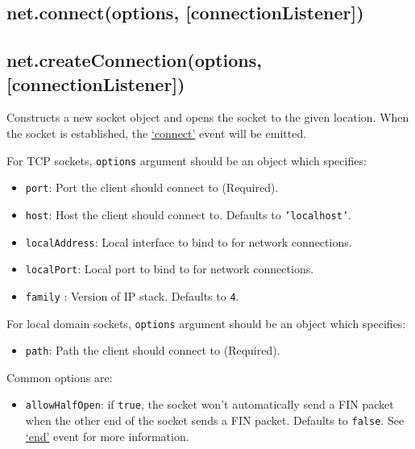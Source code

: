 \subsection{net.connect(options,
{[}connectionListener{]})}\label{net.connectoptions-connectionlistener}

\subsection{net.createConnection(options,
{[}connectionListener{]})}\label{net.createconnectionoptions-connectionlistener}

Constructs a new socket object and opens the socket to the given
location. When the socket is established, the
\hyperref[netux5feventux5fconnect]{`connect'} event will be emitted.

For TCP sockets, \texttt{options} argument should be an object which
specifies:

\begin{itemize}
\item
  \texttt{port}: Port the client should connect to (Required).
\item
  \texttt{host}: Host the client should connect to. Defaults to
  \texttt{'localhost'}.
\item
  \texttt{localAddress}: Local interface to bind to for network
  connections.
\item
  \texttt{localPort}: Local port to bind to for network connections.
\item
  \texttt{family} : Version of IP stack. Defaults to \texttt{4}.
\end{itemize}

For local domain sockets, \texttt{options} argument should be an object
which specifies:

\begin{itemize}
\itemsep1pt\parskip0pt
\item
  \texttt{path}: Path the client should connect to (Required).
\end{itemize}

Common options are:

\begin{itemize}
\itemsep1pt\parskip0pt
\item
  \texttt{allowHalfOpen}: if \texttt{true}, the socket won't
  automatically send a FIN packet when the other end of the socket sends
  a FIN packet. Defaults to \texttt{false}. See
  \hyperref[netux5feventux5fend]{`end'} event for more information.
\end{itemize}


